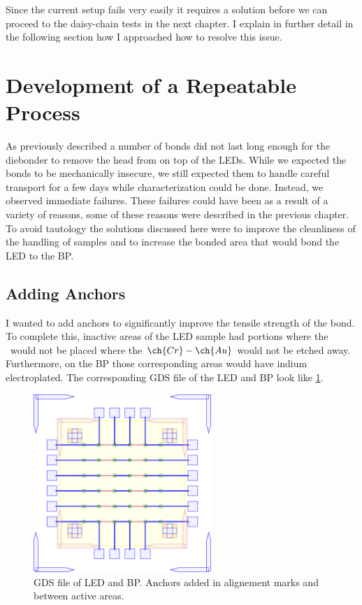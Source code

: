 Since the current setup fails very easily it requires a solution before we can proceed to the daisy-chain tests in the next chapter.
I explain in further detail in the following section how I approached how to resolve this issue.


\section{Development of a Repeatable Process}
\label{sec:Ch2_repeatable}

As previously described a number of bonds did not last long enough for the diebonder to remove the head from on top of the LEDs. While we expected the bonds to be mechanically insecure, we still expected them to handle careful transport for a few days while characterization could be done. Instead, we observed immediate failures. These failures could have been as a result of a variety of reasons, some of these reasons were described in the previous chapter. To avoid tautology the solutions discussed here were to improve the cleanliness of the handling of samples and to increase the bonded area that would bond the LED to the BP.

\subsection{Adding Anchors}

I wanted to add anchors to significantly improve the tensile strength of the bond. To complete this, inactive areas of the LED sample had portions where the \uleds \ would not be placed where the $\ch{Cr}-\ch{Au}$ would not be etched away. Furthermore, on the BP those corresponding areas would have indium electroplated. The corresponding GDS file of the LED and BP look like \ref{fig:gds_bp_led_anchors}.



\begin{figure}
    \centering
    \includegraphics[width=0.6\textwidth]{Main/Ch2/DC_DieBTest_V5.GDStex_output.pdf}
    \caption{GDS file of LED and BP. Anchors added in alignement marks and between active areas. }
    \label{fig:gds_bp_led_anchors}
\end{figure}


